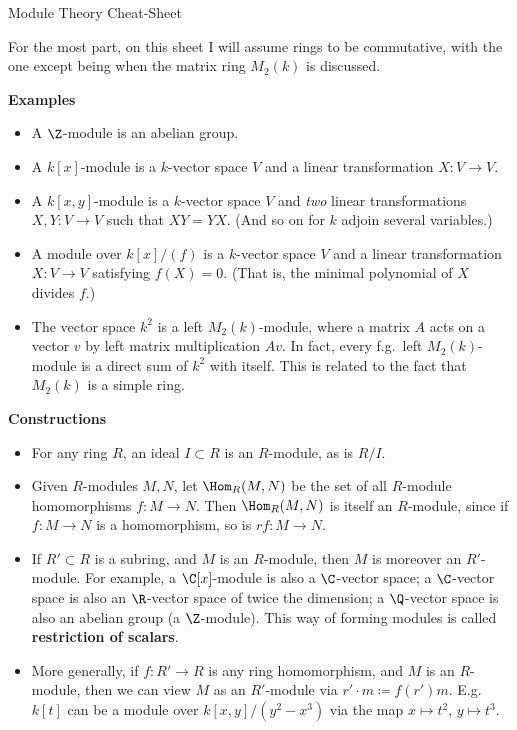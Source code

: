 \begin{center}
    \huge Module Theory Cheat-Sheet
\end{center}

\vspace{5mm}
\noindent For the most part, on this sheet I will assume rings to be commutative, with the one except being when the matrix ring $M_2(k)$ is discussed.

\noindent\textbf{Examples}
\begin{itemize}
    \item A $\Z$-module is an abelian group.
    \item A $k[x]$-module is a $k$-vector space $V$ and a linear transformation $X \colon V \to V$.
    \item A $k[x,y]$-module is a $k$-vector space $V$ and \emph{two} linear transformations $X, Y \colon V \to V$ such that $XY = YX$. (And so on for $k$ adjoin several variables.)
    \item A module over $k[x]/(f)$ is a $k$-vector space $V$ and a linear transformation $X \colon V \to V$ satisfying $f(X) = 0$. (That is, the minimal polynomial of $X$ divides $f$.)
    \item The vector space $k^2$ is a left $M_2(k)$-module, where a matrix $A$ acts on a vector $v$ by left matrix multiplication $Av$. In fact, every f.g.\ left $M_2(k)$-module is a direct sum of $k^2$ with itself. This is related to the fact that $M_2(k)$ is a simple ring.
\end{itemize}

\noindent\textbf{Constructions}
\begin{itemize}
    \item For any ring $R$, an ideal $I \subset R$ is an $R$-module, as is $R/I$.
    \item Given $R$-modules $M,N$, let $\Hom_R(M,N)$ be the set of all $R$-module homomorphisms $f \colon M \to N$. Then $\Hom_R(M,N)$ is itself an $R$-module, since if $f \colon M \to N$ is a homomorphism, so is $rf \colon M \to N$.
    \item If $R' \subset R$ is a subring, and $M$ is an $R$-module, then $M$ is moreover an $R'$-module. For example, a $\C[x]$-module is also a $\C$-vector space; a $\C$-vector space is also an $\R$-vector space of twice the dimension; a $\Q$-vector space is also an abelian group (a $\Z$-module). This way of forming modules is called \textbf{restriction of scalars}.
    \item More generally, if $f\colon R' \to R$ is any ring homomorphism, and $M$ is an $R$-module, then we can view $M$ as an $R'$-module via $r' \cdot m \coloneqq f(r')m$. E.g.\ $k[t]$ can be a module over $k[x,y]/(y^2-x^3)$ via the map $x \mapsto t^2$, $y \mapsto t^3$.
\end{itemize}

